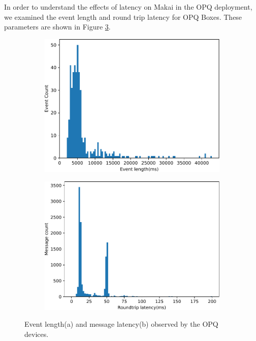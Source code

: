 In order to understand the effects of latency on Makai in the OPQ deployment, we examined the event length and round trip latency for OPQ Boxes.
These parameters are shown in Figure \ref{expdes:fig:el_la}.

\begin{figure}[h]
    \centering
    \begin{subfigure}{.45\textwidth}
        \centering
        \includegraphics[width=1\linewidth]{img/napali_eval/event_length.pdf}
        \caption{}
        \label{expdes:fig:event_length}
    \end{subfigure}\hspace{5mm}
    \begin{subfigure}{.45\textwidth}
        \centering
        \includegraphics[width=1\linewidth]{img/napali_eval/latency.pdf}
        \caption{}
        \label{expdes:fig:latency}
    \end{subfigure}
    \caption{Event length(a) and message latency(b) observed by the OPQ devices.}

    \label{expdes:fig:el_la}
\end{figure}

